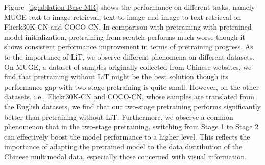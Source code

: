 \documentclass[11pt]{article}
\begin{document}
Figure~\ref{fig:ablation Base MR} shows the performance on different tasks, namely MUGE text-to-image retrieval, text-to-image and image-to-text retrieval on Flicrk30K-CN and COCO-CN. 
In comparison with pretraining with pretrained model initialization, pretraining from scratch performs much worse though it shows consistent performance improvement in terms of pretraining progress. 
As to the importance of LiT, we observe different phenomena on different datasets. On MUGE, a dataset of samples originally collected from Chinese websites, we find that pretraining without LiT might be the best solution though its performance gap with two-stage pretraining is quite small. 
However, on the other datasets, i.e., Flickr30K-CN and COCO-CN, whose samples are translated from the English datasets, we find that our two-stage pretraining performs significantly better than pretraining without LiT. 
Furthermore, we observe a common phenomenon that in the two-stage pretraining, switching from Stage 1 to Stage 2 can effectively boost the model performance to a higher level. 
This reflects the importance of adapting the pretrained model to the data distribution of the Chinese multimodal data, especially those concerned with visual information. 
\end{document}
